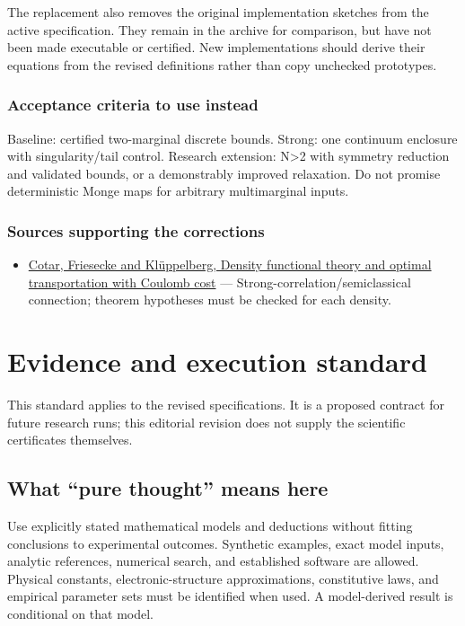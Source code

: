\documentclass[
  11pt,
]{article}
\providecommand{\tightlist}{%
  \setlength{\itemsep}{0pt}\setlength{\parskip}{0pt}}
\begin{document}
The replacement also removes the original implementation sketches from
the active specification. They remain in the archive for comparison, but
have not been made executable or certified. New implementations should
derive their equations from the revised definitions rather than copy
unchecked prototypes.

\subsubsection{Acceptance criteria to use instead}

Baseline: certified two-marginal discrete bounds. Strong: one continuum
enclosure with singularity/tail control. Research extension:
N\textgreater2 with symmetry reduction and validated bounds, or a
demonstrably improved relaxation. Do not promise deterministic Monge
maps for arbitrary multimarginal inputs.

\subsubsection{Sources supporting the corrections}

\begin{itemize}
\tightlist
\item
  \href{https://arxiv.org/abs/1104.0603}{Cotar, Friesecke and
  Klüppelberg, Density functional theory and optimal transportation with
  Coulomb cost} --- Strong-correlation/semiclassical connection; theorem
  hypotheses must be checked for each density.
\end{itemize}

\section{Evidence and execution standard}

This standard applies to the revised specifications. It is a proposed
contract for future research runs; this editorial revision does not
supply the scientific certificates themselves.

\subsection{What ``pure thought'' means here}

Use explicitly stated mathematical models and deductions without fitting
conclusions to experimental outcomes. Synthetic examples, exact model
inputs, analytic references, numerical search, and established software
are allowed. Physical constants, electronic-structure approximations,
constitutive laws, and empirical parameter sets must be identified when
used. A model-derived result is conditional on that model.
\end{document}
